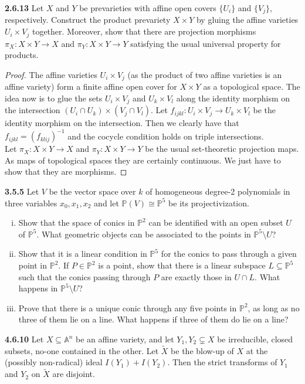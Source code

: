 \documentclass[11pt,letterpaper]{report}
\newcommand{\affine}{\mathbb{A}}
\newcommand{\proj}{\mathbb{P}}
\begin{document}
\noindent\textbf{2.6.13}
Let $X$ and $Y$ be prevarieties with affine open covers $\{U_i\}$ and $\{V_j\}$, respectively. Construct the product prevariety $X\times Y$ by gluing the affine varieties $U_i\times V_j$ together. Moreover, show that there are projection morphisms $\pi_X:X\times Y\to X$ and $\pi_Y:X\times Y\to Y$ satisfying the usual universal property for products.
\begin{proof}
	The affine varieties $U_i\times V_j$ (as the product of two affine varieties is an affine variety) form a finite affine open cover for $X\times Y$ as a topological space. The idea now is to glue the sets $U_i\times V_j$ and $U_k\times V_l$ along the identity morphism on the intersection $(U_i\cap U_k)\times (V_j\cap V_l)$. Let $f_{ijkl}:U_i\times V_j\to U_k\times V_l$ be the identity morphism on the intersection. Then we clearly have that $f_{ijkl} = (f_{klij})^{-1}$ and the cocycle condition holds on triple intersections.\\

	\noindent Let $\pi_X:X\times Y\to X$ and $\pi_Y:X\times Y\to Y$ be the usual set-theoretic projection maps. As maps of topological spaces they are certainly continuous. We just have to show that they are morphisms. 
\end{proof}


\noindent\textbf{3.5.5}
Let $V$ be the vector space over $k$ of homogeneous degree-2 polynomials in three variables $x_0, x_1, x_2$ and let $\proj(V) \cong \proj^5$ be its projectivization.
\begin{enumerate}[(i)]
	\item Show that the space of conics in $\proj^2$ can be identified with an open subset $U$ of $\proj^5$. What geometric objects can be associated to the points in $\proj^5\setminus U$?

	\item Show that it is a linear condition in $\proj^5$ for the conics to pass through a given point in $\proj^2$. If $P\in \proj^2$ is a point, show that there is a linear subspace $L\subseteq \proj^5$ such that the conics passing through $P$ are exactly those in $U\cap L$. What happens in $\proj^5\setminus U$?

	\item Prove that there is a unique conic through any five points in $\proj^2$, as long as no three of them lie on a line. What happens if three of them do lie on a line?
\end{enumerate}

\noindent\textbf{4.6.10}
Let $X\subseteq \affine^n$ be an affine variety, and let $Y_1, Y_2\subsetneq X$ be irreducible, closed subsets, no-one contained in the other. Let $\tilde{X}$ be the blow-up of $X$ at the (possibly non-radical) ideal $I(Y_1)+I(Y_2)$. Then the strict transforms of $Y_1$ and $Y_2$ on $\tilde{X}$ are disjoint.
\end{document}
